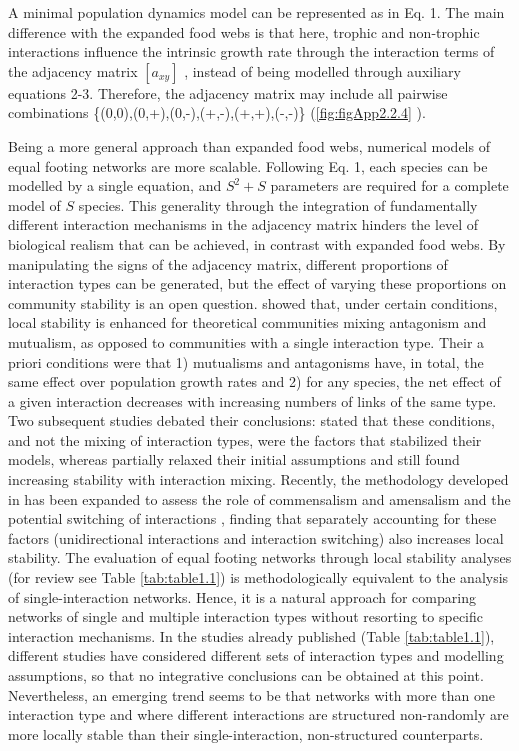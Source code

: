 A minimal population dynamics model can be represented as in Eq. 1. The main difference with the expanded food webs is that here, trophic and non-trophic interactions influence the intrinsic growth rate through the interaction terms of the adjacency matrix  $\left[a_{\mathit{xy}}\right]$  , instead of being modelled through auxiliary equations 2-3. Therefore, the adjacency matrix may include all pairwise combinations \{(0,0),(0,+),(0,-),(+,-),(+,+),(-,-)\} (\cref{fig:figApp2.2.4} ).

Being a more general approach than expanded food webs, numerical models of equal footing networks are more scalable. Following Eq. 1, each species can be modelled by a single equation, and  $S^2+S$ parameters are required for a complete model of  $S$ species. This generality through the integration of fundamentally different interaction mechanisms in the adjacency matrix hinders the level of biological realism that can be achieved, in contrast with expanded food webs. By manipulating the signs of the adjacency matrix, different proportions of interaction types can be generated, but the effect of varying these proportions on community stability is an open question. \cite{Mougi2012} showed that, under certain conditions, local stability is enhanced for theoretical communities mixing antagonism and mutualism, as opposed to communities with a single interaction type. Their a priori conditions were that 1) mutualisms and antagonisms have, in total, the same effect over population growth rates and 2) for any species, the net effect of a given interaction decreases with increasing numbers of links of the same type. Two subsequent studies debated their conclusions: \citep{Suweis2014} stated that these conditions, and not the mixing of interaction types, were the factors that stabilized their models, whereas \citep{Kondoh2015} partially relaxed their initial assumptions and still found increasing stability with interaction mixing. Recently, the methodology developed in \citep{Mougi2012} has been expanded to assess the role of commensalism and amensalism \cite{Mougi2016a} and the potential switching of interactions \cite{Mougi2016b}, finding that separately accounting for these factors (unidirectional interactions and interaction switching) also increases local stability. The evaluation of equal footing networks through local stability analyses (for review see Table \ref{tab:table1.1}) is methodologically equivalent to the analysis of single-interaction networks. Hence, it is a natural approach for comparing networks of single and multiple interaction types without resorting to specific interaction mechanisms. In the studies already published (Table \ref{tab:table1.1}), different studies have considered different sets of interaction types and modelling assumptions, so that no integrative conclusions can be obtained at this point. Nevertheless, an emerging trend seems to be that networks with more than one interaction type and where different interactions are structured non-randomly are more locally stable than their single-interaction, non-structured counterparts.

